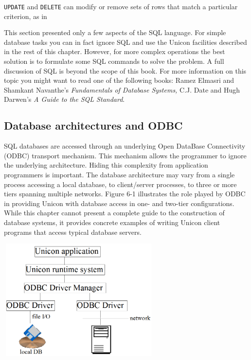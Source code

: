 \texttt{UPDATE} and \texttt{DELETE} can modify or remove sets of rows
that match a particular criterion, as in


This section presented only a few aspects of the SQL language. For
simple database tasks you can in fact ignore SQL and use the Unicon
facilities described in the rest of this chapter. However, for more
complex operations the best solution is to formulate some SQL commands
to solve the problem. A full discussion of SQL is beyond the scope of
this book. For more information on this topic you might want to read
one of the following books: Ramez Elmasri and Shamkant
Navanthe's \textit{Fundamentals of Database Systems,}
C.J. Date and Hugh Darwen's \textit{A Guide to the SQL Standard}.

\subsection{Database architectures and ODBC}

SQL databases are accessed through an underlying Open
DataBase Connectivity (ODBC) transport mechanism. This mechanism allows
the programmer to ignore the underlying architecture. Hiding this
complexity from application programmers is important. The database
architecture may vary from a single process accessing a local database,
to client/server processes, to three or more tiers spanning multiple
networks. Figure 6-1 illustrates the role played by ODBC in providing
Unicon with database access in one- and two-tier configurations. While
this chapter cannot present a complete guide to the construction of
database systems, it provides concrete examples of writing Unicon
client programs that access typical database servers.

\begin{center}
\includegraphics[width=3.2in,height=2.4in]{ub-img/odbcarch.png}
\end{center}

